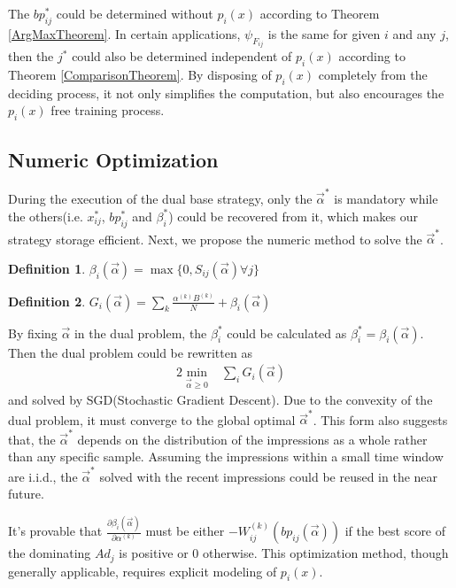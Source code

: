 \documentclass{article}
\newtheorem{definition}{Definition}[section]
\newcommand{\sx}{x_{ij}}
\newcommand{\sbp}{bp_{ij}}
\newcommand{\sW}{W_{ij}^{(k)}}
\newcommand{\sB}{B^{(k)}}
\newcommand{\salpha}{\alpha^{(k)}}
\newcommand{\sbeta}{\beta_i}
\newcommand{\sF}{F_{ij}}
\newcommand{\sS}{S_{ij}}
\newcommand{\sG}{G_i}
\newcommand{\valpha}{\vec{\alpha}}
\newcommand{\pcost}{\psi}
\begin{document}
The $\sbp^*$ could be determined without $p_i(x)$ according to Theorem \ref{ArgMaxTheorem}.
In certain applications, $\pcost_{\sF}$ is the same for given $i$ and any $j$,
    then the $j^*$ could also be determined independent of $p_i(x)$ according to Theorem \ref{ComparisonTheorem}.
By disposing of $p_i(x)$ completely from the deciding process,
    it not only simplifies the computation, but also encourages the $p_i(x)$ free training process.

\subsection{Numeric Optimization} \label{DSPNumericOptimization}

During the execution of the dual base strategy,
    only the $\valpha^*$ is mandatory
    while the others(i.e. $\sx^*$, $\sbp^*$ and $\sbeta^*$) could be recovered from it,
    which makes our strategy storage efficient.
Next, we propose the numeric method to solve the $\valpha^*$.

\begin{definition}
$\sbeta(\valpha) = \max \{ 0, \sS(\valpha) \forall j \}$
\end{definition}

\begin{definition}
$\sG(\valpha) = \sum\limits_k \frac{\salpha \sB}{N} + \sbeta(\valpha)$
\end{definition}

By fixing $\valpha$ in the dual problem, the $\sbeta^*$ could be calculated as $\sbeta^* = \sbeta(\valpha)$.
Then the dual problem could be rewritten as
\begin{alignat}{2}
\min\limits_{\valpha \ge 0} & \sum\limits_i \sG(\valpha)
\end{alignat}
    and solved by SGD(Stochastic Gradient Descent).
Due to the convexity of the dual problem, it must converge to the global optimal $\valpha^*$.
This form also suggests that, the $\valpha^*$ depends on the distribution of the impressions as a whole
    rather than any specific sample.
Assuming the impressions within a small time window are i.i.d.,
    the $\valpha^*$ solved with the recent impressions could be reused in the near future.

It's provable that $\frac{\partial\sbeta(\valpha)}{\partial\salpha}$ must be
    either $-\sW(\sbp(\valpha))$ if the best score of the dominating $Ad_j$ is positive or $0$ otherwise.
This optimization method, though generally applicable, requires explicit modeling of $p_i(x)$.
\end{document}
